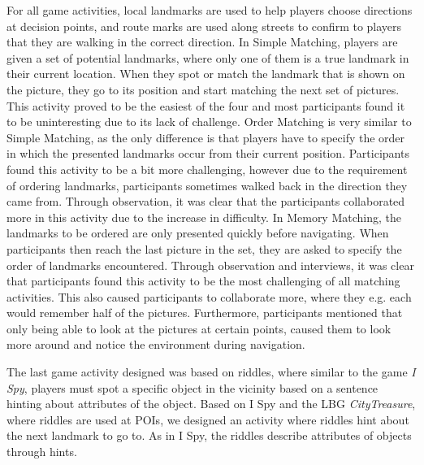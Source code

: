 For all game activities, local landmarks are used to help players choose directions at decision points, and route marks are used along streets to confirm to players that they are walking in the correct direction. In Simple Matching, players are given a set of potential landmarks, where only one of them is a true landmark in their current location. When they spot or match the landmark that is shown on the picture, they go to its position and start matching the next set of pictures. This activity proved to be the easiest of the four and most participants found it to be uninteresting due to its lack of challenge. Order Matching is very similar to Simple Matching, as the only difference is that players have to specify the order in which the presented landmarks occur from their current position. Participants found this activity to be a bit more challenging, however due to the requirement of ordering landmarks, participants sometimes walked back in the direction they came from. Through observation, it was clear that the participants collaborated more in this activity due to the increase in difficulty. In Memory Matching, the landmarks to be ordered are only presented quickly before navigating. When participants then reach the last picture in the set, they are asked to specify the order of landmarks encountered. Through observation and interviews, it was clear that participants found this activity to be the most challenging of all matching activities. This also caused participants to collaborate more, where they e.g. each would remember half of the pictures. Furthermore, participants mentioned that only being able to look at the pictures at certain points, caused them to look more around and notice the environment during navigation.

The last game activity designed was based on riddles, where similar to the game \textit{I Spy}\cite{childrensGames}, players must spot a specific object in the vicinity based on a sentence hinting about attributes of the object. Based on I Spy and the LBG \textit{CityTreasure}, where riddles are used at POIs, we designed an activity where riddles hint about the next landmark to go to. As in I Spy, the riddles describe attributes of objects through hints.

